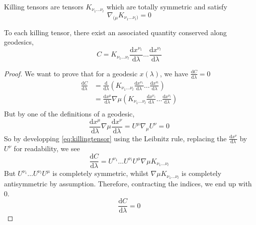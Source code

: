 \begin{definition}
    Killing tensors are tensors $K_{\nu_1\dots \nu_l}$ which are totally symmetric and satisfy 
    \begin{equation}
        \nabla_{(\mu} K_{\nu_1\dots \nu_l)} = 0
    \end{equation}
\end{definition}
To each killing tensor, there exist an associated quantity conserved along geodesics, 
\begin{equation}
    C = K_{\nu_1\dots \nu_l} \frac{\text{d}x^{\nu_1}}{\text{d}\lambda} \dots \frac{\text{d}x^{\nu_l}}{\text{d}\lambda}
\end{equation}
\begin{proof}
    We want to prove that for a geodesic $x(\lambda)$, we have $\frac{\text{d}C}{\text{d}\lambda} = 0$
    \begin{equation}
        \begin{aligned}
            \frac{\text{d}C}{\text{d}\lambda} &= \frac{\text{d}}{\text{d}\lambda}\left(K_{\nu_1\dots \nu_l} \frac{\text{d}x^{\nu_1}}{\text{d}\lambda} \dots \frac{\text{d}x^{\nu_l}}{\text{d}\lambda}\right) \\
            &= \frac{\text{d}x^\mu}{\text{d}\lambda}\nabla\mu\left(K_{\nu_1\dots \nu_l} \frac{\text{d}x^{\nu_1}}{\text{d}\lambda} \dots \frac{\text{d}x^{\nu_l}}{\text{d}\lambda}\right) \\
        \end{aligned}
    \label{eq:killingtensor}\end{equation}
    But by one of the definitions of a geodesic, 
    \begin{equation}
        \frac{\text{d}x^\mu}{\text{d}\lambda}\nabla\mu \frac{\text{d}x^{\nu}}{\text{d}\lambda} = U^\mu \nabla_\mu U^\nu = 0
    \end{equation}
    So by developping \eqref{eq:killingtensor} using the Leibnitz rule, replacing the $\frac{\text{d}x^{\nu}}{\text{d}\lambda}$ by $U^\nu$ for readability, we see 
    \begin{equation}
        \frac{\text{d}C}{\text{d}\lambda} = U^{\nu_1}\dots U^{\nu_l} U^\mu \nabla\mu K_{\nu_1\dots \nu_l} 
    \end{equation}
    But $U^{\nu_1}\dots U^{\nu_l} U^\mu$ is completely symmetric, whilst $\nabla\mu K_{\nu_1\dots \nu_l} $ is completely antisymmetric by assumption. Therefore, contracting the indices, we end up with 0. 
    \begin{equation}
        \frac{\text{d}C}{\text{d}\lambda} = 0
    \end{equation}
\end{proof}